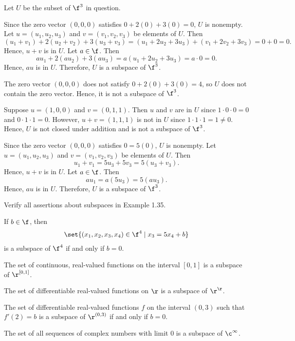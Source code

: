 \begin{sol}
    Let $U$ be the subset of $\f^3$ in question.
    \begin{subexercises}
        \item Since the zero vector $(0, 0, 0)$ satisfies $0 + 2(0) + 3(0) = 0$, $U$ is nonempty. Let $u = (u_1, u_2, u_3)$ and $v = (v_1, v_2, v_3)$ be elements of $U$. Then
        \[(u_1 + v_1) + 2(u_2 + v_2) + 3(u_3 + v_3) = (u_1 + 2u_2 + 3u_3) + (v_1 + 2v_2 + 3v_3) = 0 + 0 = 0.\]
        Hence, $u + v$ is in $U$. Let $a \in \f$. Then
        \[a u_1 + 2(a u_2) + 3(a u_3) = a(u_1 + 2u_2 + 3u_3) = a \cdot 0 = 0.\]
        Hence, $au$ is in $U$. Therefore, $U$ is a subspace of $\f^3$.
        \item The zero vector $(0, 0, 0)$ does not satisfy $0 + 2(0) + 3(0) = 4$, so $U$ does not contain the zero vector. Hence, it is not a subspace of $\f^3$.
        \item Suppose $u = (1, 0, 0)$ and $v = (0, 1, 1)$. Then $u$ and $v$ are in $U$ since $1 \cdot 0 \cdot 0 = 0$ and $0 \cdot 1 \cdot 1 = 0$. However, $u + v = (1, 1, 1)$ is not in $U$ since $1 \cdot 1 \cdot 1 = 1 \neq 0$. Hence, $U$ is not closed under addition and is not a subspace of $\f^3$.
        \item Since the zero vector $(0, 0, 0)$ satisfies $0 = 5(0)$, $U$ is nonempty. Let $u = (u_1, u_2, u_3)$ and $v = (v_1, v_2, v_3)$ be elements of $U$. Then
        \[u_1 + v_1 = 5u_3 + 5v_3 = 5(u_3 + v_3).\]
        Hence, $u + v$ is in $U$. Let $a \in \f$. Then
        \[a u_1 = a(5u_3) = 5(a u_3).\]
        Hence, $au$ is in $U$. Therefore, $U$ is a subspace of $\f^3$. \qh
    \end{subexercises}
\end{sol}

\begin{exercise}[1c2]
    Verify all assertions about subspaces in Example 1.35.
    \begin{subexercises}
        \item If $b \in \f$, then
        \[\set{(x_1, x_2, x_3, x_4) \in \f^4 \mid x_3 = 5x_4 + b}\]
        is a subspace of $\f^4$ if and only if $b = 0$.
        \item The set of continuous, real-valued functions on the interval $[0, 1]$ is a subspace of $\r^{[0, 1]}$.
        \item The set of differentiable real-valued functions on $\r$ is a subspace of $\r^{\r}$.
        \item The set of differentiable real-valued functions $f$ on the interval $(0, 3)$ such that $f'(2) = b$ is a subspace of $\r^{(0, 3)}$ if and only if $b = 0$.
        \item The set of all sequences of complex numbers with limit 0 is a subspace of $\c^\infty$.
    \end{subexercises}
\end{exercise}

